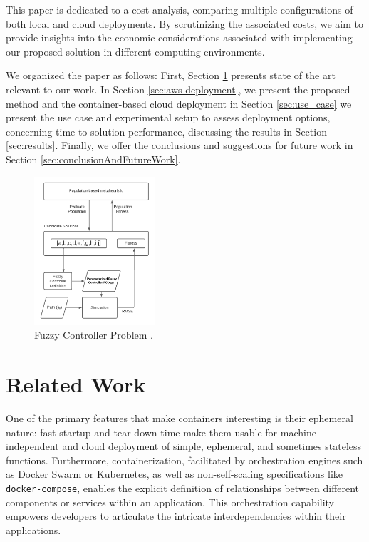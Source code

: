 \documentclass{cys}
\begin{document}
This paper is dedicated to a cost analysis, comparing multiple 
configurations of both local and cloud deployments. By scrutinizing the associated 
costs, we aim to provide insights into the economic considerations associated with 
implementing our proposed solution in different computing environments.


We organized the paper as follows: First, Section \ref{sec:relatedWork} presents state of the art relevant to our work. 
In Section \ref{sec:aws-deployment}, we present the proposed method and the container-based
cloud deployment in Section \ref{sec:use_case} we present the use case and experimental setup to assess 
deployment options, concerning time-to-solution performance, discussing  the results in Section \ref{sec:results}. 
Finally, we offer the conclusions and suggestions for future work in Section \ref{sec:conclusionAndFutureWork}.

\begin{figure}[ht]
\centering
\includegraphics[width=0.4\textwidth]{fisopt}
\caption{Fuzzy Controller Problem \cite{mancilla2022tracking}.}
\label{fig:Eval}
\end{figure}


\section{Related Work}
\label{sec:relatedWork}
One of the primary features that make containers interesting is their
ephemeral nature: fast startup and tear-down time make them usable for
machine-independent and cloud deployment of simple, ephemeral, and
sometimes stateless functions. 
Furthermore, containerization, facilitated by orchestration engines 
such as Docker Swarm or Kubernetes, as well as non-self-scaling 
specifications like {\tt docker-compose}, enables the explicit 
definition of relationships between different components or services 
within an application. This orchestration capability empowers 
developers to articulate the intricate interdependencies within their applications.
\end{document}
